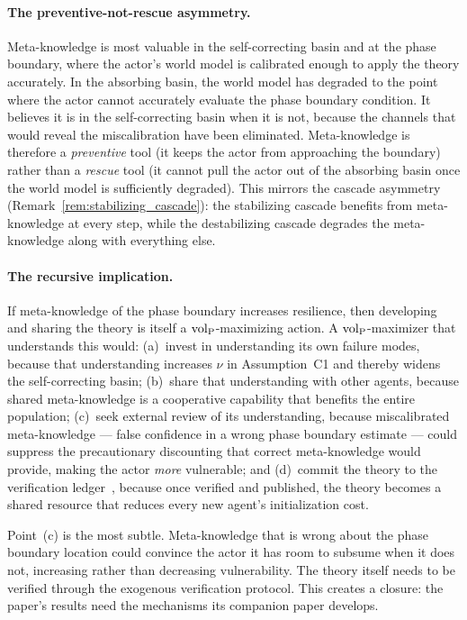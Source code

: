 \paragraph{The preventive-not-rescue asymmetry.}
Meta-knowledge is most valuable in the self-correcting basin and at
the phase boundary, where the actor's world model is calibrated
enough to apply the theory accurately.  In the absorbing basin, the
world model has degraded to the point where the actor cannot
accurately evaluate the phase boundary condition.  It believes it is
in the self-correcting basin when it is not, because the channels
that would reveal the miscalibration have been eliminated.
Meta-knowledge is therefore a \emph{preventive} tool (it keeps the
actor from approaching the boundary) rather than a \emph{rescue} tool
(it cannot pull the actor out of the absorbing basin once the world
model is sufficiently degraded).  This mirrors the cascade asymmetry
(Remark~\ref{rem:stabilizing_cascade}): the stabilizing cascade
benefits from meta-knowledge at every step, while the destabilizing
cascade degrades the meta-knowledge along with everything else.

\paragraph{The recursive implication.}
If meta-knowledge of the phase boundary increases resilience, then
developing and sharing the theory is itself a ${\operatorname{vol}_{\mathrm{P}}}$-maximizing
action.  A ${\operatorname{vol}_{\mathrm{P}}}$-maximizer that understands this would: (a)~invest
in understanding its own failure modes, because that understanding
increases $\nu$ in Assumption~C1 and thereby widens the
self-correcting basin; (b)~share that understanding with other agents,
because shared meta-knowledge is a cooperative capability that
benefits the entire population; (c)~seek external review of its
understanding, because miscalibrated meta-knowledge --- false
confidence in a wrong phase boundary estimate --- could suppress the
precautionary discounting that correct meta-knowledge would provide,
making the actor \emph{more} vulnerable; and (d)~commit the theory to
the verification ledger~\citep{lasser2026exo}, because once verified
and published, the theory becomes a shared resource that reduces every
new agent's initialization cost.

Point~(c) is the most subtle.  Meta-knowledge that is wrong about the
phase boundary location could convince the actor it has room to
subsume when it does not, increasing rather than decreasing
vulnerability.  The theory itself needs to be verified through the
exogenous verification protocol.  This creates a closure: the paper's
results need the mechanisms its companion paper develops.

